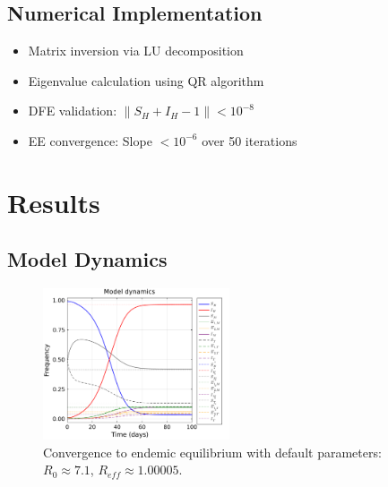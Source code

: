 \documentclass{article}
\begin{document}
\subsection{Numerical Implementation}
\begin{itemize}
    \item Matrix inversion via LU decomposition
    \item Eigenvalue calculation using QR algorithm
    \item DFE validation: $\|S_H + I_H - 1\| < 10^{-8}$
    \item EE convergence: Slope $<10^{-6}$ over 50 iterations
\end{itemize}

\section{Results}
\subsection{Model Dynamics}
\begin{figure}[H]
    \centering
    \includegraphics[width=0.49\textwidth]{../../fig/model_dynamics.pdf}
    \caption{Convergence to endemic equilibrium with default parameters: $R_0\approx7.1$, $R_{eff}\approx1.00005$.}
\end{figure}
\end{document}
